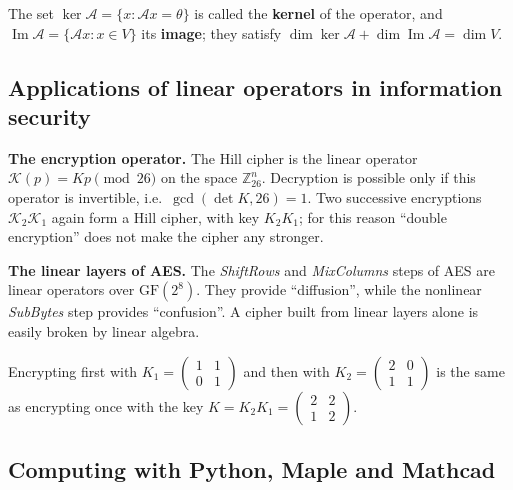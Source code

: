 \begin{tarif}
The set $\ker\mathcal A=\{x\colon\mathcal Ax=\theta\}$ is called the \textbf{kernel}
of the operator, and $\operatorname{Im}\mathcal A=\{\mathcal Ax\colon x\in V\}$ its
\textbf{image}; they satisfy $\dim\ker\mathcal A+\dim\operatorname{Im}\mathcal A=\dim V$.
\end{tarif}

\subsection{Applications of linear operators in information security}

\textbf{The encryption operator.} The Hill cipher is the linear operator
$\mathcal K(p)=Kp\pmod{26}$ on the space $\mathbb Z_{26}^n$. Decryption is possible
only if this operator is invertible, i.e.\ $\gcd(\det K,26)=1$. Two successive
encryptions $\mathcal K_2\mathcal K_1$ again form a Hill cipher, with key $K_2K_1$;
for this reason “double encryption” does not make the cipher any stronger.

\textbf{The linear layers of AES.} The \emph{ShiftRows} and \emph{MixColumns}
steps of AES are linear operators over $\mathrm{GF}(2^8)$. They provide
“diffusion”, while the nonlinear \emph{SubBytes} step provides “confusion”. A
cipher built from linear layers alone is easily broken by linear algebra.

\begin{misol}
Encrypting first with $K_1=\begin{pmatrix}1&1\\0&1\end{pmatrix}$ and then with
$K_2=\begin{pmatrix}2&0\\1&1\end{pmatrix}$ is the same as encrypting once with the key
$K=K_2K_1=\begin{pmatrix}2&2\\1&2\end{pmatrix}$.
\end{misol}

\subsection{Computing with Python, Maple and Mathcad}

